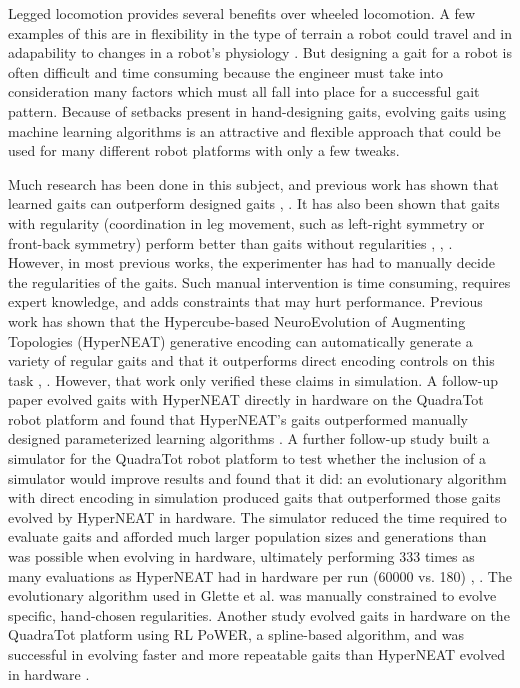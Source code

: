 Legged locomotion provides several benefits over wheeled locomotion. 
A few examples of this are in flexibility in the type of terrain a robot could travel and in adapability to changes in a robot's physiology \cite{bongard:lipson}.
But designing a gait for a robot is often difficult and time consuming because the engineer must take into consideration many factors which must all fall into place for a successful gait pattern. 
Because of setbacks present in hand-designing gaits, evolving gaits using machine learning algorithms is an attractive and flexible approach that could be used for many different robot platforms with only a few tweaks. 

Much research has been done in this subject, and previous work has shown that learned gaits can outperform designed gaits \cite{valsalam:mii}, \cite{kohl:stone}. 
It has also been shown that gaits with regularity (coordination in leg movement, such as left-right symmetry or front-back symmetry) perform better than gaits without regularities \cite{valsalam:mii}, \cite{clune1}, \cite{clune3}.
However, in most previous works, the experimenter has had to manually decide the regularities of the gaits. 
Such manual intervention is time consuming, requires expert knowledge, and adds constraints that may hurt performance. 
Previous work has shown that the Hypercube-based NeuroEvolution of Augmenting Topologies (HyperNEAT) generative encoding \cite{stanley1} can automatically generate a variety of regular gaits and that it outperforms direct encoding controls on this task \cite{clune1}, \cite{clune2}. 
However, that work only verified these claims in simulation. 
A follow-up paper evolved gaits with HyperNEAT directly in hardware on the QuadraTot robot platform and found that HyperNEAT's gaits outperformed manually designed parameterized learning algorithms \cite{yos:clune}. %
A further follow-up study \cite{glette} built a simulator for the QuadraTot robot platform to test whether the inclusion of a simulator would improve results and found that it did:  an evolutionary algorithm with direct encoding in simulation produced gaits that outperformed those gaits evolved by HyperNEAT in hardware. 
The simulator reduced the time required to evaluate gaits and afforded much larger population sizes and generations than was possible when evolving in hardware, ultimately performing 333 times as many evaluations as HyperNEAT had in hardware per run (60000 vs. 180) \cite{yos:clune}, \cite{glette}. 
The evolutionary algorithm used in Glette et al. \cite{glette} was manually constrained to evolve specific, hand-chosen regularities. 
Another study evolved gaits in hardware on the QuadraTot platform using RL PoWER, a spline-based algorithm, and was successful in evolving faster and more repeatable gaits than HyperNEAT evolved in hardware \cite{haocheng}. 

